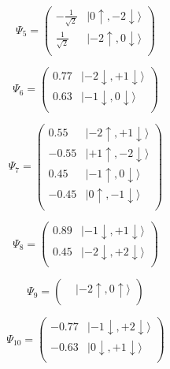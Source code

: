 \documentclass{article}
\begin{document}
\begin{equation}
\Psi_{5} = 
\begin{pmatrix}
-\frac{1}{\sqrt{2}}  &  |0\uparrow , -2\downarrow\rangle  \\
\frac{1}{\sqrt{2}}  &  |-2\uparrow , 0\downarrow\rangle  \\
\end{pmatrix}
\end{equation}

\begin{equation}
\Psi_{6} = 
\begin{pmatrix}
      0.77  &  |-2\downarrow , +1\downarrow\rangle  \\
      0.63  &  |-1\downarrow , 0\downarrow\rangle  \\
\end{pmatrix}
\end{equation}

\begin{equation}
\Psi_{7} = 
\begin{pmatrix}
      0.55  &  |-2\uparrow , +1\downarrow\rangle  \\
-      0.55  &  |+1\uparrow , -2\downarrow\rangle  \\
      0.45  &  |-1\uparrow , 0\downarrow\rangle  \\
-      0.45  &  |0\uparrow , -1\downarrow\rangle  \\
\end{pmatrix}
\end{equation}

\begin{equation}
\Psi_{8} = 
\begin{pmatrix}
      0.89  &  |-1\downarrow , +1\downarrow\rangle  \\
      0.45  &  |-2\downarrow , +2\downarrow\rangle  \\
\end{pmatrix}
\end{equation}

\begin{equation}
\Psi_{9} = 
\begin{pmatrix}
  &  |-2\uparrow , 0\uparrow\rangle  \\
\end{pmatrix}
\end{equation}

\begin{equation}
\Psi_{10} = 
\begin{pmatrix}
-      0.77  &  |-1\downarrow , +2\downarrow\rangle  \\
-      0.63  &  |0\downarrow , +1\downarrow\rangle  \\
\end{pmatrix}
\end{equation}
\end{document}
